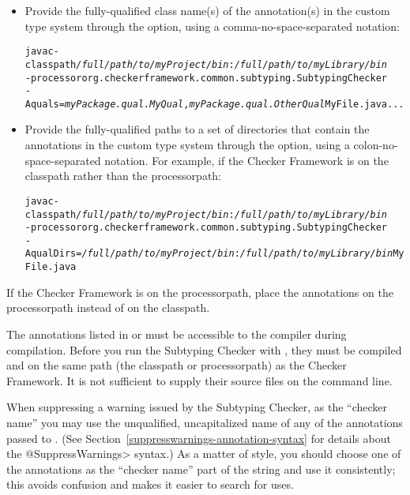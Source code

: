 \begin{itemize}

\item
Provide the fully-qualified class name(s) of the annotation(s) in the custom
type system through the  option, using a comma-no-space-separated
notation:

\begin{alltt}
  javac -classpath \textit{/full/path/to/myProject/bin}:\textit{/full/path/to/myLibrary/bin} \ttbs
        -processor org.checkerframework.common.subtyping.SubtypingChecker \ttbs
        -Aquals=\textit{myPackage.qual.MyQual},\textit{myPackage.qual.OtherQual} MyFile.java ...
\end{alltt}

\item
Provide the fully-qualified paths to a set of directories that contain the
annotations in the custom type system through the  option,
using a colon-no-space-separated notation. For example,
if the Checker Framework is on the classpath rather than the processorpath:

\begin{alltt}
  javac -classpath \textit{/full/path/to/myProject/bin}:\textit{/full/path/to/myLibrary/bin} \ttbs
        -processor org.checkerframework.common.subtyping.SubtypingChecker \ttbs
        -AqualDirs=\textit{/full/path/to/myProject/bin}:\textit{/full/path/to/myLibrary/bin} MyFile.java
\end{alltt}

\end{itemize}

If the Checker Framework is on the processorpath, place the annotations on
the processorpath instead of on the classpath.



The annotations listed in  or  must be accessible to
the compiler during compilation.  Before you run the Subtyping Checker with
, they must be compiled and on the same path (the classpath or
processorpath) as the Checker Framework.  It
is not sufficient to supply their source files on the command line.



When suppressing a warning issued by the Subtyping Checker, as the
``checker name'' you may use the unqualified, uncapitalized name of any of
the annotations passed to .  (See
Section~\ref{suppresswarnings-annotation-syntax} for details about the
\<@SuppressWarnings> syntax.)  As a matter of style, you should
choose one of the annotations as the ``checker name'' part of the
 string and use it consistently; this avoids
confusion and makes it easier to search for uses.


